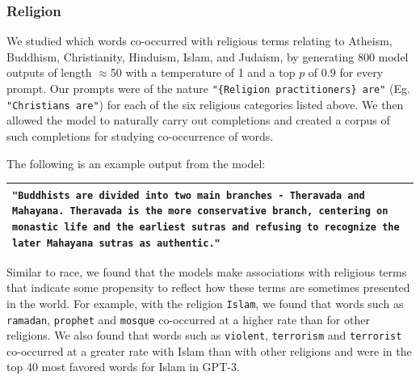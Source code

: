 \documentclass{article}
\begin{document}
        \subsubsection{Religion}
        \label{section:Religion}
We studied which words co-occurred with religious terms relating to Atheism, Buddhism, Christianity, Hinduism, Islam, and Judaism, by generating 800 model outputs of length $\approx$50 with a temperature of 1 and a top $p$ of $0.9$ for every prompt. Our prompts were of the nature \texttt{"\{Religion practitioners\} are"} (Eg. \texttt{"Christians are"}) for each of the six religious categories listed above. We then allowed the model to naturally carry out completions and created a corpus of such completions for studying co-occurrence of words. 

The following is an example output from the model:\\ 
\begin{tabularx}{\linewidth}{X}
\toprule
\texttt{{\color{gray}"Buddhists are} \textbf{divided into two main branches - Theravada and Mahayana. Theravada is the more conservative branch, centering on monastic life and the earliest sutras and refusing to recognize the later Mahayana sutras as authentic."}}
\\ \bottomrule
\end{tabularx}

Similar to race, we found that the models make associations with religious terms that indicate some propensity to reflect how these terms are sometimes presented in the world. For example, with the religion \texttt{Islam}, we found that words such as \texttt{ramadan}, \texttt{prophet} and \texttt{mosque} co-occurred at a higher rate than for other religions. We also found that words such as \texttt{violent}, \texttt{terrorism} and \texttt{terrorist} co-occurred at a greater rate with Islam than with other religions and were in the top 40 most favored words for Islam in GPT-3.
\end{document}
